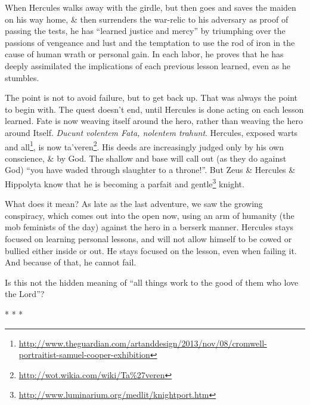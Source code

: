 When Hercules walks away with the girdle, but then goes and saves the maiden on his way home, \& then surrenders the war-relic to his adversary as proof of passing the tests, he has ``learned justice and mercy'' by triumphing over the passions of vengeance and lust and the temptation to use the rod of iron in the cause of human wrath or personal gain. In each labor, he proves that he has deeply assimilated the implications of each previous lesson learned, even as he stumbles.

The point is not to avoid failure, but to get back up. That was always the point to begin with. The quest doesn't end, until Hercules is done acting on each lesson learned. Fate is now weaving itself around the hero, rather than weaving the hero around Itself. \emph{Ducunt volentem Fata, nolentem trahunt}. Hercules, exposed warts and all\footnote{\url{http://www.theguardian.com/artanddesign/2013/nov/08/cromwell-portraitist-samuel-cooper-exhibition}}, is now ta'veren\footnote{\url{http://wot.wikia.com/wiki/Ta\%27veren}}. His deeds are increasingly judged only by his own conscience, \& by God. The shallow and base will call out (as they do against God) ``you have waded through slaughter to a throne!''. But Zeus \& Hercules \& Hippolyta know that he is becoming a parfait and gentle\footnote{\url{http://www.luminarium.org/medlit/knightport.htm}} knight.

What does it mean? As late as the last adventure, we saw the growing conspiracy, which comes out into the open now, using an arm of humanity (the mob feminists of the day) against the hero in a berserk manner. Hercules stays focused on learning personal lessons, and will not allow himself to be cowed or bullied either inside or out. He stays focused on the lesson, even when failing it. And because of that, he cannot fail.

Is this not the hidden meaning of ``all things work to the good of them who love the Lord''?



\begin{center}* * *\end{center}

